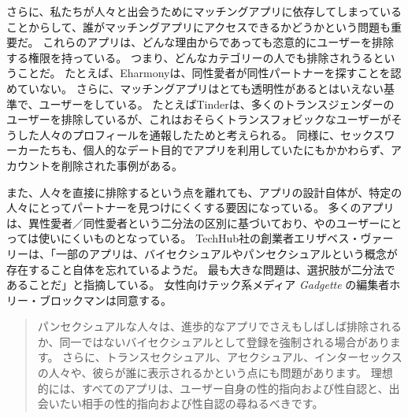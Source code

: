 \documentclass[paper=a4,book,openany]{jlreq}
\begin{document}
さらに、私たちが人々と出会うためにマッチングアプリに依存してしまっていることからして、誰がマッチングアプリにアクセスできるかどうかという問題も重要だ。
これらのアプリは、どんな理由からであっても恣意的にユーザーを排除する権限を持っている。
つまり、どんなカテゴリーの人でも排除されうるということだ。
たとえば、Eharmonyは、同性愛者が同性パートナーを探すことを認めていない。
さらに、マッチングアプリはとても透明性があるとはいえない基準で、ユーザーをしている。
たとえばTinderは、多くのトランスジェンダーのユーザーを排除しているが、これはおそらくトランスフォビックなユーザーがそうした人々のプロフィールを通報したためと考えられる\citep{tierney17:_why_are_tran}。
同様に、セックスワーカーたちも、個人的なデート目的でアプリを利用していたにもかかわらず、アカウントを削除された事例がある\citep{al-othman18:_sex_work_say}。

また、人々を直接に排除するという点を離れても、アプリの設計自体が、特定の人々にとってパートナーを見つけにくくする要因になっている。
多くのアプリは、異性愛者／同性愛者という二分法の区別に基づいており、やのユーザーにとっては使いにくいものとなっている。
TechHub社の創業者エリザベス・ヴァーリーは、「一部のアプリは、バイセクシュアルやパンセクシュアルという概念が存在すること自体を忘れているようだ。
最も大きな問題は、選択肢が二分法であることだ」と指摘している。
女性向けテック系メディア \emph{Gadgette} の編集者ホリー・ブロックマンは同意する。

\begin{quote}
  パンセクシュアルな人々は、進歩的なアプリでさえもしばしば排除されるか、同一ではないバイセクシュアルとして登録を強制される場合があります。
さらに、トランスセクシュアル、アセクシュアル、インターセックスの人々や、彼らが誰に表示されるかという点にも問題があります。
理想的には、すべてのアプリは、ユーザー自身の性的指向および性自認と、出会いたい相手の性的指向および性自認の尋ねるべきです。
\citep{knowles16:_bisex_prob}
\end{quote}
\end{document}
